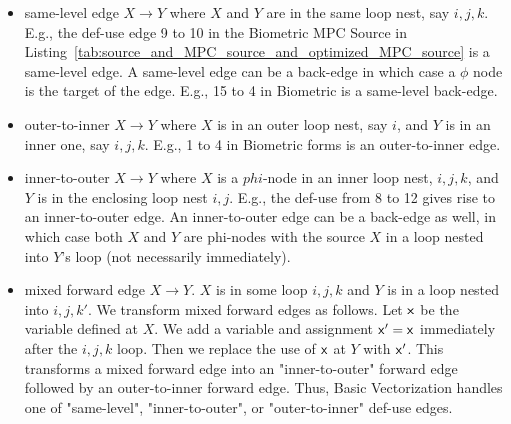 \begin{itemize}
\item same-level edge $X\rightarrow Y$ where $X$ and $Y$ are in the same loop nest, say $i,j,k$. E.g., the def-use edge 9 to 10 in the Biometric MPC Source in Listing~\ref{tab:source_and_MPC_source_and_optimized_MPC_source} is a same-level edge. A same-level edge can be a back-edge in which case a $\phi$ node is the target of the edge.
E.g., 15 to 4 in Biometric is a same-level back-edge.
\item outer-to-inner $X\rightarrow Y$ where $X$ is in an outer loop nest, say $i$, and $Y$ is in an inner one, say $i,j,k$. E.g., 1 to 4 in Biometric forms is an outer-to-inner edge.
\item inner-to-outer $X\rightarrow Y$ where $X$ is a $phi$-node in an inner loop nest, $i,j,k$, and $Y$ is in the enclosing loop nest $i,j$. E.g., the def-use from 8 to 12 gives rise to an inner-to-outer edge.
An inner-to-outer edge can be a back-edge as well, in which case both $X$ and $Y$ are phi-nodes with the source $X$ in a loop nested into $Y$'s loop (not necessarily immediately).


\item mixed forward edge $X\rightarrow Y$. $X$ is in some loop $i,j,k$ and $Y$ is in a loop nested into $i,j,k'$. We transform mixed forward edges as follows. Let ${\sf {x}}$ be the variable defined at $X$. We add a variable and assignment ${\sf {x}}' = {\sf {x}}$ immediately after the $i,j,k$ loop. Then we replace the use of ${\sf {x}}$ at $Y$ with ${\sf {x}}'$. This transforms a mixed forward edge into an "inner-to-outer" forward edge followed by an outer-to-inner forward edge. Thus, Basic Vectorization handles one of "same-level", "inner-to-outer", or "outer-to-inner" def-use edges.
 \end{itemize}

